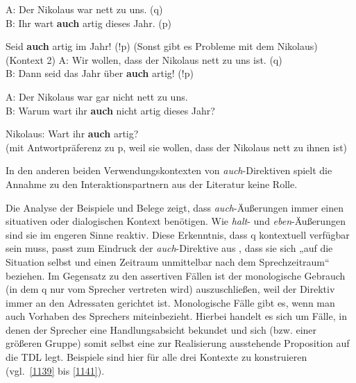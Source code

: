 \begin{exe}
	\ex\label{1135} 
	A: Der Nikolaus war nett zu uns. (q)\\
	B: Ihr wart \textbf{auch} artig dieses Jahr. (p)\\
\end{exe}	

\begin{exe}
	\ex\label{1136} 
		\begin{xlist}
			\ex\label{1136a} Seid \textbf{auch} artig im Jahr! (!p) (Sonst gibt es Probleme mit dem Nikolaus) (Kontext 2)
			\ex\label{1136b} A: Wir wollen, dass der Nikolaus nett zu uns ist. (q)\\
							 B: Dann seid das Jahr über \textbf{auch} artig! (!p)\\					 
		\end{xlist}
\end{exe}	

\begin{exe}
	\ex\label{1137} 
	A: Der Nikolaus war gar nicht nett zu uns.\\
	B: Warum wart ihr \textbf{auch} nicht artig dieses Jahr?\\
\end{exe}

\begin{exe}
	\ex\label{1138} 
	Nikolaus: Wart ihr \textbf{auch} artig?\\
	(mit Antwortpräferenz zu p, weil sie wollen, dass der Nikolaus nett zu ihnen ist)\\
\end{exe}
In den anderen beiden Verwendungskontexten von \textit{auch}-Direktiven spielt die Annahme zu den Interaktionspartnern aus der Literatur keine Rolle.

Die Analyse der Beispiele und Belege zeigt, dass \textit{auch}-Äußerungen immer einen situativen oder dialogischen Kontext benötigen. Wie \textit{halt}- und \textit{eben}-Äuße\-rungen sind sie im engeren Sinne reaktiv. Diese Erkenntnis, dass q kontextuell verfügbar sein muss, passt zum Eindruck der \textit{auch}-Direktive aus \citet[60]{Dittmann1980}, dass sie sich „auf die Situation selbst und einen Zeitraum unmittelbar nach dem Sprechzeitraum“ beziehen. Im Gegensatz zu den assertiven Fällen ist der monologische Gebrauch (in dem q nur vom Sprecher vertreten wird) auszuschließen, weil der Direktiv immer an den Adressaten gerichtet ist. Monologische Fälle gibt es, wenn man auch Vorhaben des Sprechers miteinbezieht. Hierbei handelt es sich um Fälle, in denen der Sprecher eine Handlungsabsicht bekundet und sich (bzw. einer größeren Gruppe) somit selbst eine zur Realisierung ausstehende Proposition auf die TDL legt. Beispiele sind hier für alle drei Kontexte zu konstruieren (vgl.\ \ref{1139} bis \ref{1141}).

